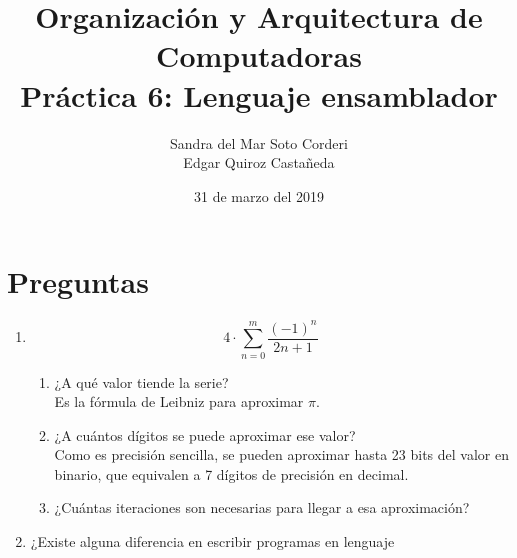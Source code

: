 \documentclass{article}
\begin{document}
    \title{
        Organización y Arquitectura de Computadoras \\
        Práctica 6: Lenguaje ensamblador \\
    }
    \date{
        31 de marzo del 2019
    }
    \author{
        Sandra del Mar Soto Corderi \\
        Edgar Quiroz Castañeda
    }
    \maketitle

    \section{Preguntas}
    \begin{enumerate}
        \item {
            \[4\cdot\sum_{n=0}^{m}{\frac{(-1)^{n}}{2n+1}}\]
            \begin{enumerate}
                \item ¿A qué valor tiende la serie?\\
                Es la fórmula de Leibniz\cite{wolfram pi} para aproximar $\pi$.
                \item ¿A cuántos dígitos se puede aproximar ese valor?\\
                Como es precisión sencilla, se pueden aproximar hasta 23 bits
                del valor en binario, que equivalen a 7 dígitos de precisión en
                decimal\cite{ieee flot32 std}.
                \item ¿Cuántas iteraciones son necesarias para llegar a esa
                aproximación?
            \end{enumerate}
        }
        \item ¿Existe alguna diferencia en escribir programas en lenguaje 

\end{enumerate}
\end{document}
